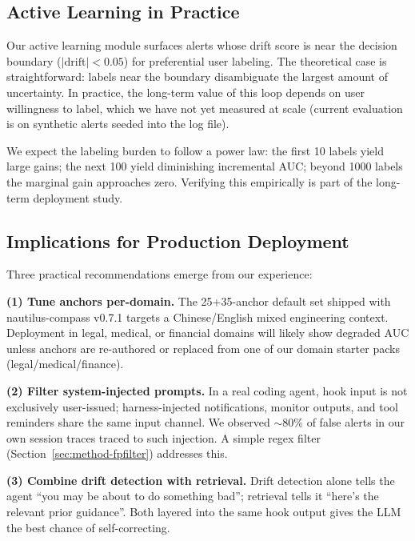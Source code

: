 \subsection{Active Learning in Practice}
\label{sec:discussion-al}

Our active learning module surfaces alerts whose drift score is
near the decision boundary ($|\mathrm{drift}| < 0.05$) for
preferential user labeling. The theoretical case is straightforward:
labels near the boundary disambiguate the largest amount of
uncertainty. In practice, the long-term value of this loop depends
on user willingness to label, which we have not yet measured at
scale (current evaluation is on synthetic alerts seeded into the
log file).

We expect the labeling burden to follow a power law: the first 10
labels yield large gains; the next 100 yield diminishing
incremental AUC; beyond 1000 labels the marginal gain approaches
zero. Verifying this empirically is part of the long-term
deployment study.

\subsection{Implications for Production Deployment}
\label{sec:discussion-prod}

Three practical recommendations emerge from our experience:

\textbf{(1) Tune anchors per-domain.} The 25+35-anchor default set
shipped with nautilus-compass v0.7.1 targets a Chinese/English mixed
engineering context. Deployment in legal, medical, or financial
domains will likely show degraded AUC unless anchors are
re-authored or replaced from one of our domain starter packs
(legal/medical/finance).

\textbf{(2) Filter system-injected prompts.} In a real coding
agent, hook input is not exclusively user-issued; harness-injected
notifications, monitor outputs, and tool reminders share the same
input channel. We observed $\sim 80\%$ of false alerts in our own
session traces traced to such injection. A simple regex filter
(Section~\ref{sec:method-fpfilter}) addresses this.

\textbf{(3) Combine drift detection with retrieval.} Drift
detection alone tells the agent ``you may be about to do
something bad''; retrieval tells it ``here's the relevant prior
guidance''. Both layered into the same hook output gives the LLM
the best chance of self-correcting.
